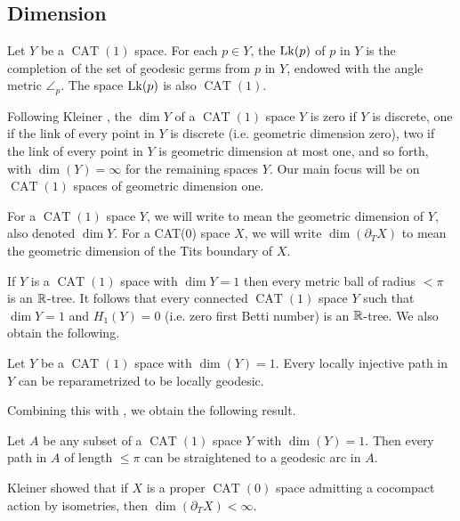 \documentclass{amsart}
\newcommand{\bdT}{\partial_T}
\DeclareMathOperator{\CAT}{CAT}
\begin{document}
\subsection{Dimension}

Let $Y$ be a $\CAT(1)$ space.
For each $p \in Y$, the  $\operatorname{Lk} (p)$ of $p$ in $Y$ is the completion of the set of geodesic germs from $p$ in $Y$, endowed with the angle metric $\angle_p$.
The space $\operatorname{Lk} (p)$ is also $\CAT(1)$.

Following Kleiner \cite{kleiner}, the  $\dim Y$ of a $\CAT(1)$ space $Y$ is zero if $Y$ is discrete, one if the link of every point in $Y$ is discrete (i.e. geometric dimension zero), two if the link of every point in $Y$ is geometric dimension at most one, and so forth, with $\dim(Y) = \infty$ for the remaining spaces $Y$.
Our main focus will be on $\CAT(1)$ spaces of geometric dimension one.

\begin{convention}
For a $\CAT(1)$ space $Y$, we will write  to mean the geometric dimension of $Y$, also denoted $\dim Y$.
For a CAT($0$) space $X$, we will write $\dim(\bdT X)$ to mean the geometric dimension of the Tits boundary of $X$.
\end{convention}

If $Y$ is a $\CAT(1)$ space with $\dim Y = 1$ then every metric ball of radius $< \pi$ is an $\mathbb{R}$-tree.
It follows that every connected $\CAT(1)$ space $Y$ such that $\dim Y = 1$ and $H_1 (Y) = 0$ (i.e. zero first Betti number) is an $\mathbb{R}$-tree.
We also obtain the following.

\begin{lemma}			\label{locally injective paths}
Let $Y$ be a $\CAT(1)$ space with $\dim(Y) = 1$.  Every locally injective path in $Y$ can be reparametrized to be locally geodesic. \end{lemma}

Combining this with , we obtain the following result.

\begin{corollary}		\label{short paths}
Let $A$ be any subset of a $\CAT(1)$ space $Y$ with $\dim(Y) = 1$.  Then every path in $A$ of length $\le \pi$ can be straightened to a geodesic arc in $A$. \end{corollary}


Kleiner showed \cite[Theorem C]{kleiner} that if $X$ is a proper $\CAT(0)$ space admitting a cocompact action by isometries, then $\dim(\bdT X) < \infty$.
\end{document}
